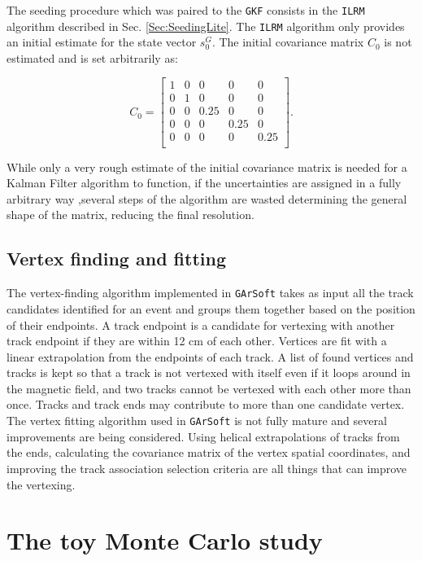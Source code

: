 The seeding procedure which was paired to the \texttt{GKF} consists in the \texttt{ILRM} algorithm described in Sec. \ref{Sec:SeedingLite}. The \texttt{ILRM} algorithm only provides an initial estimate for the state vector $s_0^G$. The initial covariance matrix $C_0$ is not estimated and is set arbitrarily as:

\begin{equation}
    \label{eq:C0}
    C_0 =\begin{bmatrix}
    1 & 0 & 0 & 0& 0 \\
    0 & 1 & 0 & 0& 0 \\
    0 & 0 & 0.25 & 0& 0 \\
    0 & 0 & 0 & 0.25& 0 \\
    0 & 0 & 0 & 0& 0.25 \\
    \end{bmatrix} .
\end{equation}

While only a very rough estimate of the initial covariance matrix is needed for a Kalman Filter algorithm to function, if the uncertainties are assigned in a fully arbitrary way ,several steps of the algorithm are wasted determining the general shape of the matrix, reducing the final resolution. 

\subsection{Vertex finding and fitting}
\label{Sec: Vertexing}
The vertex-finding algorithm implemented in \texttt{GArSoft} takes as input all the track candidates identified for an event and groups them together based on the position of their endpoints.  A track endpoint is a candidate for vertexing with another track endpoint if they are within 12 cm of each other. Vertices are fit with a linear extrapolation from the endpoints of each track. A list of found vertices and tracks is kept so that a track is not vertexed with itself even if it loops around in the magnetic field, and two tracks cannot be vertexed with each other more than once. Tracks and track ends may contribute to more than one candidate vertex.
The vertex fitting algorithm used in \texttt{GArSoft} is not fully mature and several improvements are being considered. Using helical extrapolations of tracks from the ends, calculating the covariance matrix of the vertex spatial coordinates, and improving the track association selection criteria are all
things that can improve the vertexing.


\section{The toy Monte Carlo study}
\label{Sec:ToyMCStudy_GAr}

